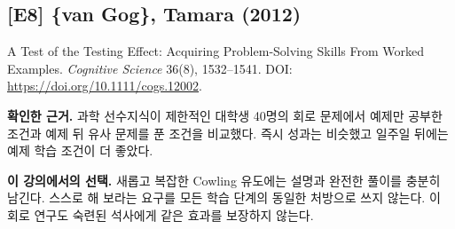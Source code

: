 \documentclass[
  10pt,
  a4paper,
]{article}
\begin{document}
\subsection{{[}E8{]} \{van Gog\}, Tamara
(2012)}\label{e8-van-gog-tamara-2012}

A Test of the Testing Effect: Acquiring Problem-Solving Skills From
Worked Examples. \emph{Cognitive Science} 36(8), 1532--1541. DOI:
\url{https://doi.org/10.1111/cogs.12002}.

\textbf{확인한 근거.} 과학 선수지식이 제한적인 대학생 40명의 회로
문제에서 예제만 공부한 조건과 예제 뒤 유사 문제를 푼 조건을 비교했다.
즉시 성과는 비슷했고 일주일 뒤에는 예제 학습 조건이 더 좋았다.

\textbf{이 강의에서의 선택.} 새롭고 복잡한 Cowling 유도에는 설명과
완전한 풀이를 충분히 남긴다. 스스로 해 보라는 요구를 모든 학습 단계의
동일한 처방으로 쓰지 않는다. 이 회로 연구도 숙련된 석사에게 같은 효과를
보장하지 않는다.
\end{document}
